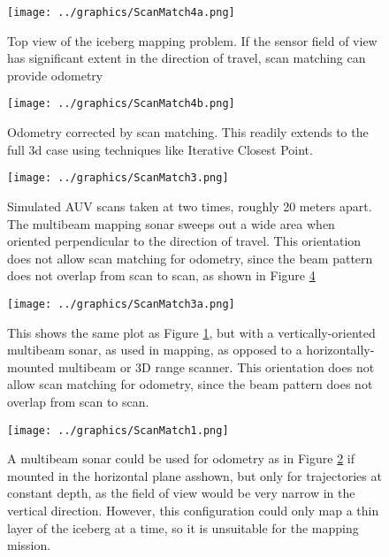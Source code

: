 \begin{figure}[htbp]
   \centering
   \texttt{[image: ../graphics/ScanMatch4a.png]} %
   \caption{Top view of the iceberg mapping problem. If the sensor field of view has significant extent in the direction of travel, scan matching can provide odometry}
   \label{fig:ScanMatch1}
   \end{figure}
    \begin{figure}[h]
   \centering
   \texttt{[image: ../graphics/ScanMatch4b.png]} %
   \caption{Odometry corrected by scan matching. This readily extends to the full 3d case using techniques like Iterative Closest Point.}
   \label{fig:ScanMatch2}
\end{figure}

\begin{figure}[h]
   \centering
   \texttt{[image: ../graphics/ScanMatch3.png]} %
   \caption{Simulated AUV scans taken at two times, roughly 20 meters apart. The multibeam mapping sonar sweeps out a wide area when oriented perpendicular to the direction of travel. This orientation does not allow scan matching for odometry, since the beam pattern does not overlap from scan to scan, as shown in Figure \ref{fig:NoMatch}}
   \label{fig:beamOrientation}
\end{figure}

\begin{figure}[h]
   \centering
   \texttt{[image: ../graphics/ScanMatch3a.png]} %
   \caption{This shows the same plot as Figure \ref{fig:ScanMatch1}, but with a vertically-oriented multibeam sonar, as used in mapping, as opposed to a horizontally-mounted multibeam or 3D range scanner. This orientation does not allow scan matching for odometry, since the beam pattern does not overlap from scan to scan.}
   \label{fig:NoMatch}
\end{figure}

\begin{figure}[h]
   \centering
   \texttt{[image: ../graphics/ScanMatch1.png]} %
   \caption{A multibeam sonar could be used for odometry as in Figure \ref{fig:ScanMatch2} if mounted in the horizontal plane asshown, but only for trajectories at constant depth, as the field of view would be very narrow in the vertical direction. However, this configuration could only map a thin layer of the iceberg at a time, so it is unsuitable for the mapping mission.}
   \label{fig:ScanMatchMultibeam}
\end{figure}

